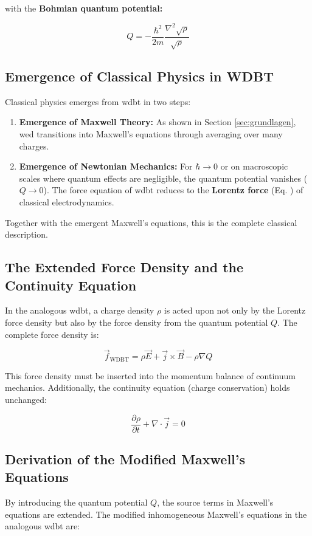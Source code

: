 with the \textbf{Bohmian quantum potential:}

\begin{equation}
    Q = -\frac{\hbar^2}{2m} \frac{\nabla^2 \sqrt{\rho}}{\sqrt{\rho}}
\end{equation}

\subsection{Emergence of Classical Physics in WDBT}
Classical physics emerges from \gls{wdbt} in two steps:

\begin{enumerate}
    \item \textbf{Emergence of Maxwell Theory:} As shown in Section \ref{sec:grundlagen}, \gls{wed} transitions into Maxwell's equations through averaging over many charges.
    \item \textbf{Emergence of Newtonian Mechanics:} For $\hbar \to 0$ or on macroscopic scales where quantum effects are negligible, the quantum potential vanishes ($Q \to 0$). The force equation of \gls{wdbt} reduces to the \textbf{Lorentz force} (Eq. ) of classical electrodynamics.
\end{enumerate}

Together with the emergent Maxwell's equations, this is the complete classical description.

\subsection{The Extended Force Density and the Continuity Equation}
In the analogous \gls{wdbt}, a charge density $\rho$ is acted upon not only by the Lorentz force density but also by the force density from the quantum potential $Q$. The complete force density is:

\begin{equation}
    \vec{f}_{\text{WDBT}} = \rho \vec{E} + \vec{j} \times \vec{B} - \rho \nabla Q
\end{equation}

This force density must be inserted into the momentum balance of continuum mechanics. Additionally, the continuity equation (charge conservation) holds unchanged:

\begin{equation}
    \frac{\partial \rho}{\partial t} + \nabla \cdot \vec{j} = 0
\end{equation}

\subsection{Derivation of the Modified Maxwell's Equations}
By introducing the quantum potential $Q$, the source terms in Maxwell's equations are extended. The modified inhomogeneous Maxwell's equations in the analogous \gls{wdbt} are:

